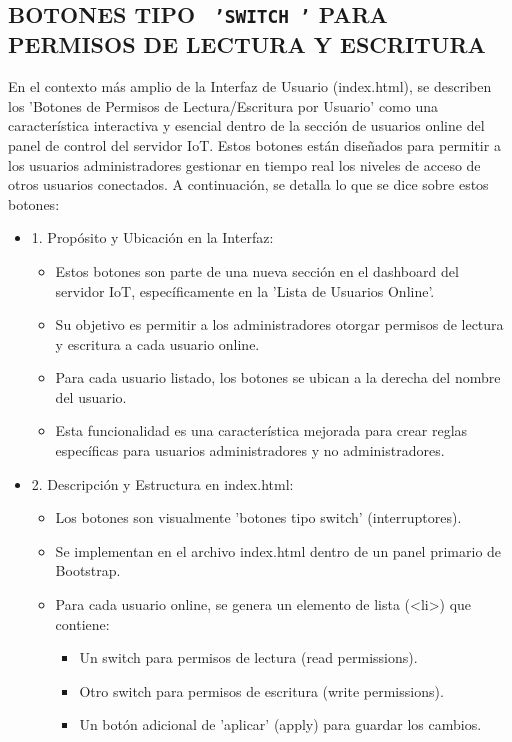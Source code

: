 \documentclass{report}
\begin{document}
\subsection{BOTONES TIPO \texttt{ 'SWITCH '} PARA PERMISOS DE LECTURA Y ESCRITURA}
En el contexto más amplio de la Interfaz de Usuario (index.html), se  describen los 'Botones de Permisos de Lectura/Escritura 
por Usuario' como una característica interactiva y esencial dentro de la sección de usuarios online del panel de control del servidor IoT. 
Estos botones están diseñados para permitir a los usuarios administradores gestionar en tiempo real los niveles de acceso de otros 
usuarios conectados.
A continuación, se detalla lo que se  dice sobre estos botones:
\begin{itemize}
    \item 1. Propósito y Ubicación en la Interfaz:
    \begin{itemize}
        \item Estos botones son parte de una nueva sección en el dashboard del servidor IoT, específicamente en la 'Lista de Usuarios Online'.
        \item Su objetivo es permitir a los administradores otorgar permisos de lectura y escritura a cada usuario online.
        \item Para cada usuario listado, los botones se ubican a la derecha del nombre del usuario.
        \item Esta funcionalidad es una característica mejorada para crear reglas específicas para usuarios administradores y no administradores.
    \end{itemize}
    \item 2. Descripción y Estructura en index.html:
    \begin{itemize}
        \item Los botones son visualmente 'botones tipo switch' (interruptores).
        \item Se implementan en el archivo index.html dentro de un panel primario de Bootstrap.
        \item Para cada usuario online, se genera un elemento de lista (<li>) que contiene:
        \begin{itemize}
            \item Un switch para permisos de lectura (read permissions).
            \item Otro switch para permisos de escritura (write permissions).
            \item Un botón adicional de 'aplicar' (apply) para guardar los cambios.

\end{itemize}
\end{itemize}
\end{itemize}
\end{document}
